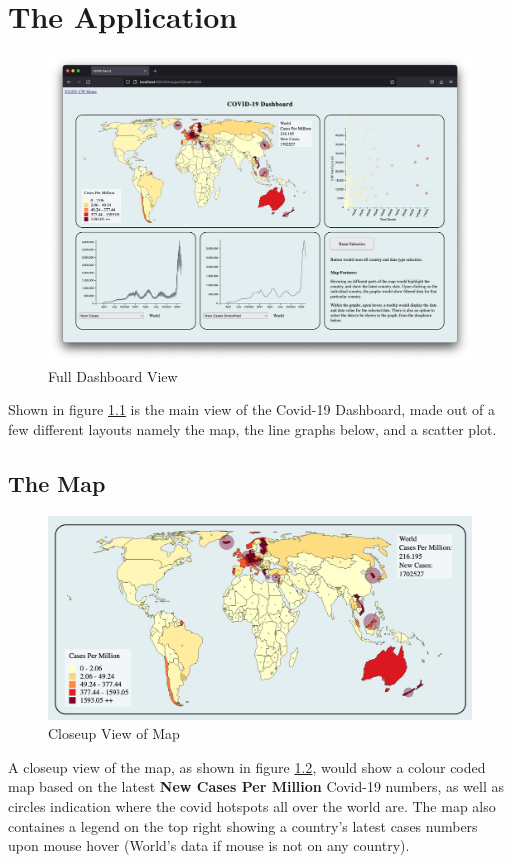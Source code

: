 \documentclass{scrreprt}
\begin{document}
\chapter{The Application}
\begin{figure}[H]
    \centering
    \includegraphics[width=\textwidth]{images/main.png}
    \caption{Full Dashboard View}
    \label{fig:main}
\end{figure}
Shown in figure \ref{fig:main} is the main view of the Covid-19 Dashboard, made out of a few different layouts namely the map, the line graphs below, and a scatter plot. 

\newpage
\section{The Map}
\begin{figure}[H]
    \centering
    \includegraphics[width=\textwidth]{images/map.png}
    \caption{Closeup View of Map}
    \label{fig:map}
\end{figure}
A closeup view of the map, as shown in figure \ref{fig:map}, would show a colour coded map based on the latest \textbf{New Cases Per Million} Covid-19 numbers, as well as circles indication where the covid hotspots all over the world are. The map also containes a legend on the top right showing a country's latest cases numbers upon mouse hover (World's data if mouse is not on any country).
\end{document}
